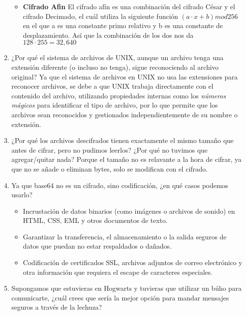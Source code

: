 \begin{enumerate}
\begin{itemize}
\item \textbf{Cifrado Afin}
El cifrado afín es una combinación del cifrado César y el cifrado Decimado, el cuál utiliza la siguiente función $(a\cdot x + b) mod 256$ en el que a es una constante primo relativo y b es una constante de desplazamiento.
Así que la combinación de los dos nos da $128 \cdot 255 = 32, 640$
\end{itemize}
\item ¿Por qué el sistema de archivos de UNIX, aunque un archivo tenga una extensión diferente
(o incluso no tenga), sigue reconociendo al archivo original?
Ya que el sistema de archivos en UNIX no usa las extensiones para reconocer archivos, se debe a que UNIX trabaja directamente con el contenido del archivo, utilizando propiedades internas como los \textit{números mágicos} para identificar el tipo de archivo, por lo que permite que los archivos sean reconocidos y gestionados independientemente de su nombre o extensión. \cite{linux}
\item ¿Por qué los archivos descifrados tienen exactamente el mismo tamaño que antes de cifrar,
pero no pudimos leerlos? ¿Por qué no tuvimos que agregar/quitar nada?
Porque el tamaño no es relavante a la hora de cifrar, ya que no se añade o eliminan bytes, solo se modifican con el cifrado.
\item Ya que base64 no es un cifrado, sino codificación, ¿en qué casos podemos usarlo?
\begin{itemize}
\item Incrustación de datos binarios (como imágenes o archivos de sonido) en HTML, CSS, EML y otros documentos de texto.
\item Garantizar la transferencia, el almacenamiento o la salida seguros de datos que puedan no estar respaldados o dañados.
\item Codificación de certificados SSL, archivos adjuntos de correo electrónico y otra información que requiera el escape de caracteres especiales. \cite{base64}
\end{itemize}
\item Supongamos que estuvieras en Hogwarts y tuvieras que utilizar un búho para comunicarte,
¿cuál crees que sería la mejor opción para mandar mensajes seguros a través de la lechuza?


\end{enumerate}
